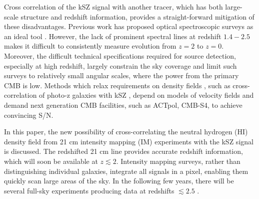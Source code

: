 Cross correlation of the kSZ signal with another tracer, which has both large-scale structure and redshift information, provides a straight-forward mitigation of these disadvantages. Previous work has proposed optical spectroscopic surveys as an ideal tool \cite{Hand12,Shao11,Li14}. 
However, the lack of prominent spectral lines at redshift $1.4-2.5$ makes it difficult to consistently measure evolution from $z=2$ to $z=0$. 
Moreover, the difficult technical specifications required for source detection, especially at high redshift, largely constrain the sky coverage and limit such surveys to relatively small angular scales, where the power from the primary CMB is low. Methods which relax requirements on density fields , such as cross-correlation of photo-z galaxies with kSZ \cite{Hill16,Ferraro16}, depend on models of velocity fields and demand next generation CMB facilities, such as ACTpol, CMB-S4, to achieve convincing S/N.

In this paper, the new possibility of cross-correlating the neutral hydrogen (HI) density field from 21 cm intensity mapping (IM) experiments with the kSZ signal is discussed.  The redshifted 21 cm line provides accurate redshift information, which will soon be available at $z\lesssim2$.  
Intensity mapping surveys, rather than distinguishing individual galaxies, integrate  all signals in a pixel, enabling them quickly scan large areas of the sky. In the following few years, there will be several full-sky experiments producing data at redshifts $\lesssim2.5$ 
\cite{2014CHIME, TIANLAI, HIRAX}.

